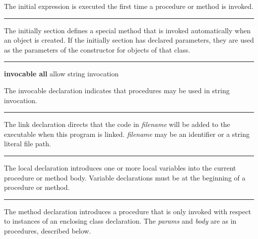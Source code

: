 \noindent
{}The \textsf{initial} expression is executed the first
time a procedure or method is invoked.

\bigskip\hrule\vspace{0.1cm}

\noindent
{}The \textsf{initially} section defines a special method
that is invoked automatically when an object is created. If the
\textsf{initially} section has declared parameters, they are used as
the parameters of the constructor for objects
of that class.

\bigskip\hrule\vspace{0.1cm}

\noindent
{}
{\textbf{invocable all} \hfill allow string invocation}

\noindent
The \textsf{invocable} declaration indicates that procedures may be used
in string invocation.

\bigskip\hrule\vspace{0.1cm}

\noindent
The \textsf{link} declaration directs that the code in
\textit{filename} will be added to the executable when this program is
linked. \textit{filename} may be an identifier or a string literal file
path.

\bigskip\hrule\vspace{0.1cm}

\noindent
{}The \textsf{local} declaration introduces one or more local
variables into the current procedure or method body.
Variable declarations must be at the beginning of a
procedure or method.

\bigskip\hrule\vspace{0.1cm}

\noindent
{}The \textsf{method} declaration introduces a procedure
that is only invoked with respect to instances of
an enclosing class declaration. The \textit{params} and \textit{body}
are as in procedures, described below.

